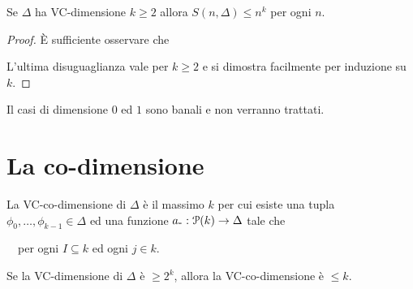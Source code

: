 \begin{corollary}
Se $\Delta$ ha VC-dimensione $k\ge 2$ allora $S(n,\Delta)\le n^k$ per ogni $n$. 
\end{corollary}

\begin{proof}
\`E sufficiente osservare che


L'ultima disuguaglianza vale per $k\ge 2$ e si dimostra facilmente per induzione su $k$.
\end{proof}

Il casi di dimensione $0$ ed $1$ sono banali e non verranno trattati.





\section{La co-dimensione}

La VC-co-dimensione di $\Delta$ \`e il massimo $k$ per cui esiste una tupla $\phi_0,\dots,\phi_{k-1}\in\Delta$ ed una funzione $a_{\mbox{-}}:\P(k)\to\Delta$ tale che 

\ \  per ogni $I\subseteq k$ ed ogni $j\in k$.

% 
% 
% 
% 


\begin{lemma}
Se la VC-dimensione di $\Delta$ \`e $\ge 2^k$, allora la VC-co-dimensione \`e $\le k$.
\end{lemma}

